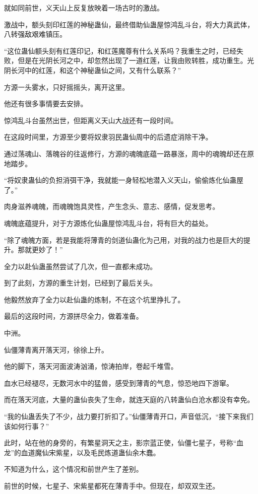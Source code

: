 \begin{this_body}
就如同前世，义天山上反复放映着一场古时的激战。

激战中，额头刻印红莲的神秘蛊仙，最终借助仙蛊屋惊鸿乱斗台，将大力真武体，八转强敌艰难镇压。

“这位蛊仙额头刻有红莲印记，和红莲魔尊有什么关系吗？我重生之时，已经失败，但是在光阴长河之中，却忽然出现了一道红莲，让我由败转胜，成功重生。光阴长河中的红莲，和这个神秘蛊仙之间，又有什么联系？”

方源一头雾水，只好摇摇头，离开这里。

他还有很多事情要去安排。

惊鸿乱斗台虽然出世，但距离义天山大战还有一段时间。

在这段时间里，方源至少要将奴隶羽民蛊仙周中的后遗症消除干净。

通过荡魂山、落魄谷的往返修行，方源的魂魄底蕴一路暴涨，周中的魂魄却还在原地踏步。

“将奴隶蛊仙的负担消弭干净，我就能一身轻松地潜入义天山，偷偷炼化仙蛊屋了。”

肉身滋养魂魄，而魂魄饱具灵性，产生念头、意志、感情，促发思考。

魂魄底蕴提升，对于方源炼化仙蛊屋惊鸿乱斗台，将有巨大的益处。

“除了魂魄方面，若是我能将薄青的剑道仙蛊化为己用，对我的战力也是巨大的提升。那就更妙了！”

全力以赴仙蛊虽然尝试了几次，但一直都未成功。

到了此刻，方源的重生计划，已经到了最后关头。

他毅然放弃了全力以赴仙蛊的炼制，不在这个坑里挣扎了。

最后的这段时间，方源拼尽全力，做着准备。

中洲。

仙僵薄青离开落天河，徐徐上升。

他的脚下，落天河面波涛汹涌，惊涛拍岸，卷起千堆雪。

血水已经褪尽，无数河水中的猛兽，感受到薄青的气息，惊恐地四下游窜。

而在落天河底，大量的蛊仙丧失了生命，就连天庭的八转蛊仙白沧水都没有幸免。

“我的仙蛊丢失了不少，战力要打折扣了。”仙僵薄青开口，声音低沉，“接下来我们该如何行事？”

此时，站在他的身旁的，有繁星洞天之主，影宗蓝正使，仙僵七星子，号称“血龙”的血道魔仙宋紫星，以及毛民炼道蛊仙余木蠢。

不知道为什么，这个情况和前世产生了差别。

前世的时候，七星子、宋紫星都死在薄青手中。但现在，却双双生还。


\end{this_body}
